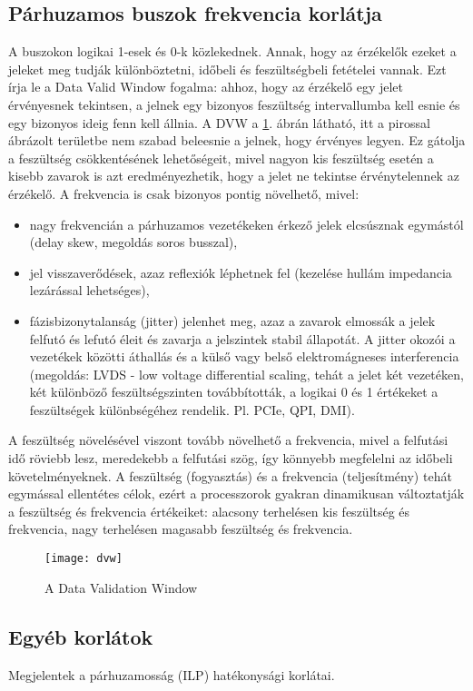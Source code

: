 \subsection{Párhuzamos buszok frekvencia korlátja}
A buszokon logikai 1-esek és 0-k közlekednek. Annak, hogy az érzékelők ezeket a jeleket meg tudják különböztetni, időbeli és feszültségbeli fetételei vannak.
Ezt írja le a Data Valid Window fogalma: ahhoz, hogy az érzékelő egy jelet érvényesnek tekintsen, a jelnek egy bizonyos feszültség intervallumba kell esnie és egy bizonyos ideig fenn kell állnia.
A DVW a \ref{fig:dvw}. ábrán látható, itt a pirossal ábrázolt területbe nem szabad beleesnie a jelnek, hogy érvényes legyen.
Ez gátolja a feszültség csökkentésének lehetőségeit, mivel nagyon kis feszültség esetén a kisebb zavarok is azt eredményezhetik, hogy a jelet ne tekintse érvénytelennek az érzékelő.
A frekvencia is csak bizonyos pontig növelhető, mivel:
\begin{itemize}
    \item nagy frekvencián a párhuzamos vezetékeken érkező jelek elcsúsznak egymástól (delay skew, megoldás soros busszal),
    \item jel visszaverődések, azaz reflexiók léphetnek fel (kezelése hullám impedancia lezárással lehetséges),
    \item fázisbizonytalanság (jitter) jelenhet meg, azaz a zavarok elmossák a jelek felfutó és lefutó éleit és zavarja a jelszintek stabil állapotát. A jitter okozói a vezetékek közötti áthallás és a külső vagy belső elektromágneses interferencia (megoldás: LVDS - low voltage differential scaling, tehát a jelet két vezetéken, két különböző feszültségszinten továbbították, a logikai 0 és 1 értékeket a feszültségek különbségéhez rendelik. Pl. PCIe, QPI, DMI).
\end{itemize}
A feszültség növelésével viszont tovább növelhető a frekvencia, mivel a felfutási idő röviebb lesz, meredekebb a felfutási szög, így könnyebb megfelelni az időbeli követelményeknek.
A feszültség (fogyasztás) és a frekvencia (teljesítmény) tehát egymással ellentétes célok, ezért a processzorok gyakran dinamikusan változtatják a feszültség és frekvencia értékeiket: alacsony terhelésen kis feszültség és frekvencia, nagy terhelésen magasabb feszültség és frekvencia.
\begin{figure}[H]
    \texttt{[image: dvw]}
    \centering
    \caption{A Data Validation Window}
    \label{fig:dvw}
\end{figure}

\subsection{Egyéb korlátok}
Megjelentek a párhuzamosság (ILP) hatékonysági korlátai.

